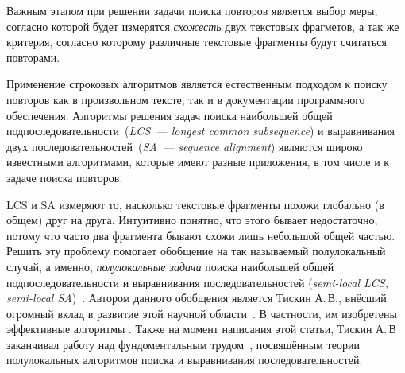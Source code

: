 Важным этапом при решении задачи поиска повторов является выбор
меры, согласно которой будет измерятся \emph{схожесть} двух текстовых фрагметов, а так же критерия, согласно которому различные текстовые фрагменты будут считаться повторами.


Применение строковых алгоритмов является %
естественным подходом к поиску повторов как в произвольном тексте, так и в документации программного обеспечения.
Алгоритмы решения задач поиска наибольшей общей подпоследовательности~(\emph{LCS~--- longest common subsequence}) и выравнивания двух последовательностей~(\emph{SA~--- sequence alignment}) являются широко известными алгоритмами, которые имеют разные приложения, в том числе и к задаче поиска повторов.

LCS и SA измеряют то, насколько текстовые фрагменты похожи глобально (в общем) друг на друга. 
Интуитивно понятно, что этого бывает недостаточно, потому что часто два фрагмента бывают схожи лишь небольшой общей частью.
Решить эту проблему помогает обобщение на так называемый полулокальный случай, а именно, \emph{полулокальные задачи} поиска наибольшей общей подпоследовательности и выравнивания последовательностей (\emph{semi-local LCS, semi-local SA})~\cite{tiskin2006all}.
Автором данного обобщения является Тискин А.\,В., внёсший огромный вклад в развитие этой научной области~\cite{tiskin2015fast,tiskin2019bounded,krusche2009parallel,tiskin2006longest,tiskin2008semi,tiskin2011towards}.
В частности, им изобретены эффективные алгоритмы .
Также на момент написания этой статьи, Тискин А.\,В заканчивал работу над фундоментальным трудом~\cite{tiskin2006all}, посвящённым теории полулокальных алгоритмов поиска и выравнивания последовательностей.


